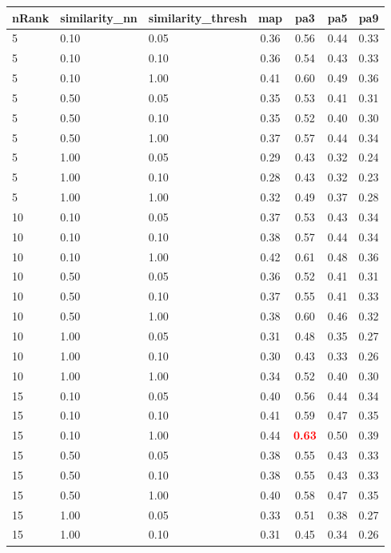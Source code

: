   
\begin{table} 
\begin{center} 
\scriptsize 
 \setlength{\tabcolsep}{.16667em} 
\begin{tabular}{lllcccc} 
nRank & similarity\_nn & similarity\_thresh & map & pa3 & pa5 & pa9 \\ 
\hline 
 5 & 0.10 & 0.05 & 0.36 & 0.56 & 0.44 & 0.33 \\ 
 5 & 0.10 & 0.10 & 0.36 & 0.54 & 0.43 & 0.33 \\ 
 5 & 0.10 & 1.00 & 0.41 & 0.60 & 0.49 & 0.36 \\ 
 5 & 0.50 & 0.05 & 0.35 & 0.53 & 0.41 & 0.31 \\ 
 5 & 0.50 & 0.10 & 0.35 & 0.52 & 0.40 & 0.30 \\ 
 5 & 0.50 & 1.00 & 0.37 & 0.57 & 0.44 & 0.34 \\ 
 5 & 1.00 & 0.05 & 0.29 & 0.43 & 0.32 & 0.24 \\ 
 5 & 1.00 & 0.10 & 0.28 & 0.43 & 0.32 & 0.23 \\ 
 5 & 1.00 & 1.00 & 0.32 & 0.49 & 0.37 & 0.28 \\ 
10 & 0.10 & 0.05 & 0.37 & 0.53 & 0.43 & 0.34 \\ 
10 & 0.10 & 0.10 & 0.38 & 0.57 & 0.44 & 0.34 \\ 
10 & 0.10 & 1.00 & 0.42 & 0.61 & 0.48 & 0.36 \\ 
10 & 0.50 & 0.05 & 0.36 & 0.52 & 0.41 & 0.31 \\ 
10 & 0.50 & 0.10 & 0.37 & 0.55 & 0.41 & 0.33 \\ 
10 & 0.50 & 1.00 & 0.38 & 0.60 & 0.46 & 0.32 \\ 
10 & 1.00 & 0.05 & 0.31 & 0.48 & 0.35 & 0.27 \\ 
10 & 1.00 & 0.10 & 0.30 & 0.43 & 0.33 & 0.26 \\ 
10 & 1.00 & 1.00 & 0.34 & 0.52 & 0.40 & 0.30 \\ 
15 & 0.10 & 0.05 & 0.40 & 0.56 & 0.44 & 0.34 \\ 
15 & 0.10 & 0.10 & 0.41 & 0.59 & 0.47 & 0.35 \\ 
15 & 0.10 & 1.00 & 0.44 & \textbf{\textcolor{red}{0.63}} & 0.50 & 0.39 \\ 
15 & 0.50 & 0.05 & 0.38 & 0.55 & 0.43 & 0.33 \\ 
15 & 0.50 & 0.10 & 0.38 & 0.55 & 0.43 & 0.33 \\ 
15 & 0.50 & 1.00 & 0.40 & 0.58 & 0.47 & 0.35 \\ 
15 & 1.00 & 0.05 & 0.33 & 0.51 & 0.38 & 0.27 \\ 
15 & 1.00 & 0.10 & 0.31 & 0.45 & 0.34 & 0.26 \\ 

\end{tabular}
\end{center}
\end{table}
